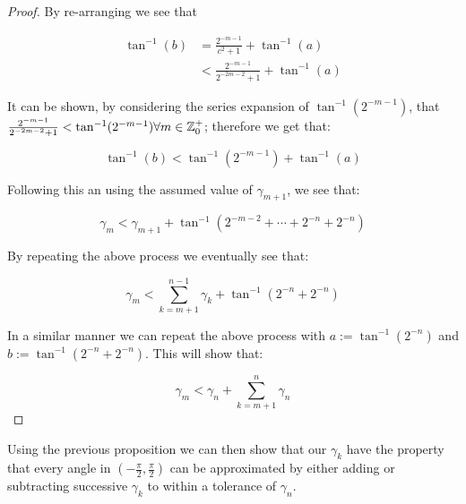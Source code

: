 {\begin{proof}
By re-arranging we see that 

\begin{align*}
	\tan^{-1}(b) &= \frac{2^{-m-1}}{c^2 + 1} + \tan^{-1}(a)\\
		&< \frac{2^{-m-1}}{2^{-2m-2} + 1} + \tan^{-1}(a)
\end{align*}

It can be shown, by considering the series expansion of \(\tan^{-1}(2^{-m-1})\), that \(\frac{2^{-m-1}}{2^{-2m-2} + 1} < \tan^{-1}(2^{-m-1}) \forall m \in \mathbb{Z}^+_0\); therefore we get that:

\[\tan^{-1}(b) < \tan^{-1}(2^{-m-1}) + \tan^{-1}(a)\]

Following this an using the assumed value of \(\gamma_{m+1}\), we see that:

\[\gamma_m < \gamma_{m+1} + \tan^{-1}(2^{-m-2} + \cdots + 2^{-n} + 2^{-n})\]

By repeating the above process we eventually see that:

\[\gamma_m < \sum_{k=m+1}^{n-1} \gamma_k + \tan^{-1}(2^{-n} + 2^{-n})\]

In a similar manner we can repeat the above process with \(a := \tan^{-1}(2^{-n})\) and \(b := \tan^{-1}(2^{-n} + 2^{-n})\). This will show that:

\begin{displaymath}
	\gamma_m < \gamma_n + \sum_{k=m+1}^{n}\gamma_n
\end{displaymath}

\end{proof}

Using the previous proposition we can then show that our \(\gamma_k\) have the property that every angle in \((-\frac{\pi}{2}, \frac{\pi}{2})\) can be approximated by either adding or subtracting successive \(\gamma_k\) to within a tolerance of \(\gamma_n\).

}
